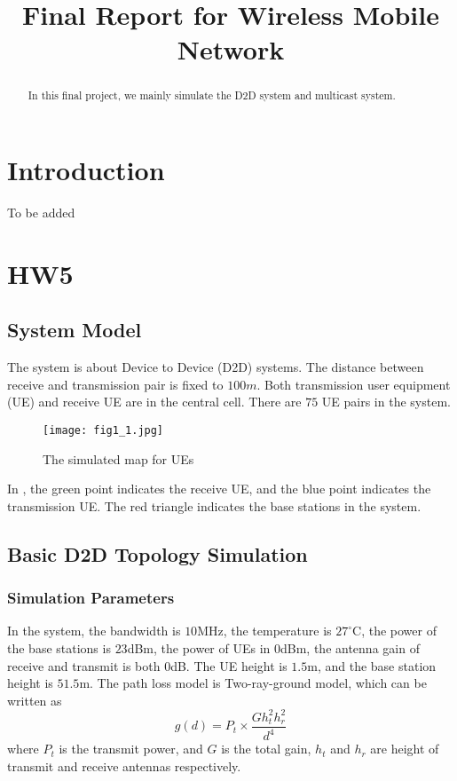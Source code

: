 \documentclass[conference]{IEEEtran}
\begin{document}
\title{Final Report for Wireless Mobile Network}
\author{
}
\maketitle
\begin{abstract}
In this final project, we mainly simulate the D2D system and multicast system.
\end{abstract}

\section{Introduction}
To be added
\section{HW5}
\subsection{System Model}
The system is about Device to Device (D2D) systems. The distance between receive and transmission pair is fixed to $100m$. Both transmission user equipment (UE) and receive UE are in the central cell. There are $75$ UE pairs in the system.
\begin{figure}[htbp]
    \centering
    \texttt{[image: fig1\_1.jpg]}
    \caption{The simulated map for UEs}
    \label{fig:ue_map}
\end{figure}


In , the green point indicates the receive UE, and the blue point indicates the transmission UE. The red triangle indicates the base stations in the system.
\subsection{Basic D2D Topology Simulation}
\subsubsection{Simulation Parameters}
In the system, the bandwidth is $10$MHz, the temperature is $27^\circ$C, the power of the base stations is $23$dBm, the power of UEs in $0$dBm, the antenna gain of receive and transmit is both $0$dB. The UE height is $1.5$m, and the base station height is $51.5$m. The path loss model is Two-ray-ground model, which can be written as
\begin{equation}\label{eqn:two_ray}
    g(d) = P_t \times \dfrac{Gh_t^2h_r^2}{d^4}
\end{equation}
where $P_t$ is the transmit power, and $G$ is the total gain, $h_t$ and $h_r$ are height of transmit and receive antennas respectively.
\end{document}
